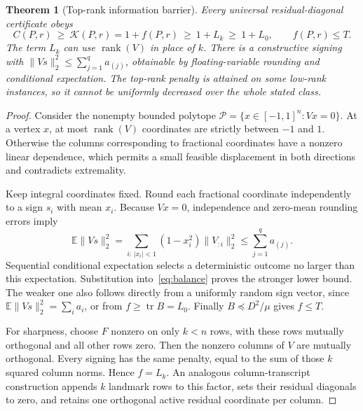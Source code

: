 \documentclass[11pt]{article}
\newtheorem{theorem}{Theorem}
\theoremstyle{definition}\newtheorem{definition}[theorem]{Definition}
\newcommand{\tr}{\operatorname{tr}}
\newcommand{\rank}{\operatorname{rank}}
\newcommand{\opt}{\mathcal K}
\begin{document}
\begin{theorem}[Top-rank information barrier]\label{thm:barrier}
Every universal residual-diagonal certificate obeys
\begin{equation}\label{eq:chain}
 C(P,r)\ \ge\ \opt(P,r)=1+f(P,r)
 \ \ge\ 1+L_k\ \ge\ 1+L_0,
 \qquad f(P,r)\le T.
\end{equation}
The term $L_k$ can use $\rank(V)$ in place of $k$. There is a constructive signing with $\|Vs\|_2^2\le\sum_{j=1}^{q}a_{(j)}$, obtainable by floating-variable rounding and conditional expectation. The top-rank penalty is attained on some low-rank instances, so it cannot be uniformly decreased over the whole stated class.
\end{theorem}
\begin{proof}
Consider the nonempty bounded polytope
$\mathcal P=\{x\in[-1,1]^n:Vx=0\}$.
At a vertex $x$, at most $\rank(V)$ coordinates are strictly between $-1$ and $1$. Otherwise the columns corresponding to fractional coordinates have a nonzero linear dependence, which permits a small feasible displacement in both directions and contradicts extremality.

Keep integral coordinates fixed. Round each fractional coordinate independently to a sign $s_i$ with mean $x_i$. Because $Vx=0$, independence and zero-mean rounding errors imply
\begin{equation}
 \mathbb E\|Vs\|_2^2
 =\sum_{i:\,|x_i|<1}(1-x_i^2)\|V_{:i}\|_2^2
 \le\sum_{j=1}^{q}a_{(j)}.
\end{equation}
Sequential conditional expectation selects a deterministic outcome no larger than this expectation. Substitution into~\eqref{eq:balance} proves the stronger lower bound. The weaker one also follows directly from a uniformly random sign vector, since $\mathbb E\|Vs\|_2^2=\sum_i a_i$, or from $f\ge\tr B=L_0$. Finally $B\preceq D^2/\mu$ gives $f\le T$.

For sharpness, choose $F$ nonzero on only $k<n$ rows, with these rows mutually orthogonal and all other rows zero. Then the nonzero columns of $V$ are mutually orthogonal. Every signing has the same penalty, equal to the sum of those $k$ squared column norms. Hence $f=L_k$. An analogous column-transcript construction appends $k$ landmark rows to this factor, sets their residual diagonals to zero, and retains one orthogonal active residual coordinate per column.
\end{proof}
\end{document}
